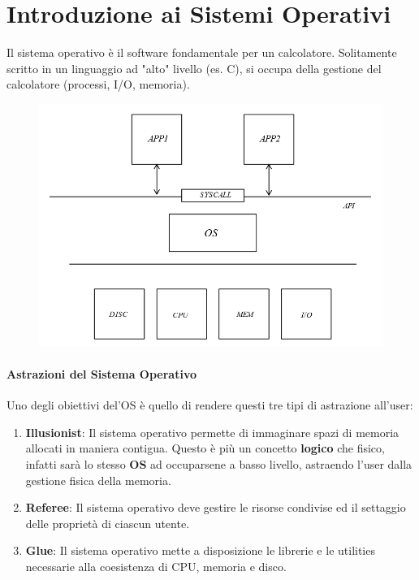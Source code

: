 \documentclass{article}
\begin{document}
\newpage

\section{Introduzione ai Sistemi Operativi}

Il sistema operativo è il software fondamentale per un calcolatore. Solitamente scritto in un linguaggio ad "alto" livello (es. C), si occupa della gestione del calcolatore (processi, I/O, memoria).

\begin{figure}[htbp]
        \center
        \includegraphics[scale=0.55]{img/os1.png}
    \end{figure}

\paragraph{Astrazioni del Sistema Operativo} Uno degli obiettivi del'OS è quello di rendere questi tre tipi di astrazione all'user:

\begin{enumerate}
    \item \textbf{Illusionist}: Il sistema operativo permette di immaginare spazi di memoria allocati in maniera contigua. Questo è più un concetto \textbf{logico} che fisico, infatti sarà lo stesso \textbf{OS} ad occuparsene a basso livello, astraendo l'user dalla gestione fisica della memoria.
    \item \textbf{Referee}: Il sistema operativo deve gestire le risorse condivise ed il settaggio delle proprietà di ciascun utente.
    \item \textbf{Glue}: Il sistema operativo mette a disposizione le librerie e le utilities necessarie alla coesistenza di CPU, memoria e disco.
\end{enumerate}
\end{document}
